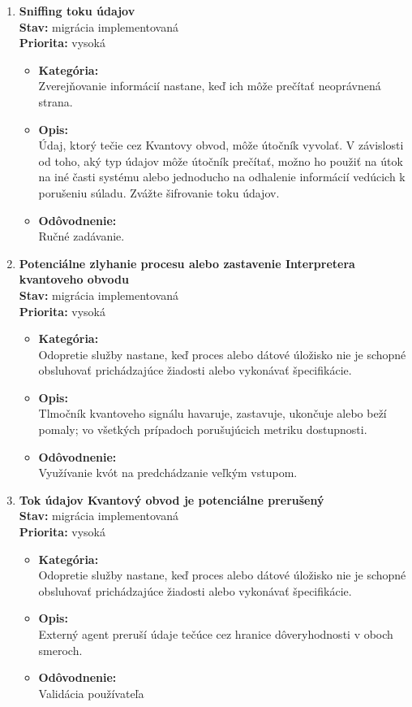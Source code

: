 \begin{enumerate}
\item \textbf{Sniffing toku údajov} \\
\textbf{Stav:} migrácia implementovaná \\
\textbf{Priorita:} vysoká

\begin{itemize}
\item[] \textbf{Kategória:} \\ 
Zverejňovanie informácií nastane, keď ich môže prečítať neoprávnená strana.
\item[] \textbf{Opis:} \\
Údaj, ktorý tečie cez Kvantovy obvod, môže útočník vyvolať. V závislosti od toho, aký typ údajov môže útočník prečítať, možno ho použiť na útok na iné časti systému alebo jednoducho na odhalenie informácií vedúcich k porušeniu súladu. Zvážte šifrovanie toku údajov.
\item[] \textbf{Odôvodnenie:} \\ 
Ručné zadávanie.
\end{itemize}

\item \textbf{Potenciálne zlyhanie procesu alebo zastavenie Interpretera kvantoveho obvodu} \\ 
\textbf{Stav:} migrácia implementovaná \\
\textbf{Priorita:} vysoká

\begin{itemize}
\item[] \textbf{Kategória:} \\
Odopretie služby nastane, keď proces alebo dátové úložisko nie je schopné obsluhovať prichádzajúce žiadosti alebo vykonávať špecifikácie.
\item[] \textbf{Opis:} \\ 
Tlmočník kvantoveho signálu havaruje, zastavuje, ukončuje alebo beží pomaly; vo všetkých prípadoch porušujúcich metriku dostupnosti.
\item[] \textbf{Odôvodnenie:} \\
Využívanie kvót na predchádzanie veľkým vstupom.
\end{itemize}

\item \textbf{Tok údajov Kvantový obvod je potenciálne prerušený} \\
\textbf{Stav:} migrácia implementovaná \\
\textbf{Priorita:} vysoká

\begin{itemize}
\item[] \textbf{Kategória:} \\
Odopretie služby nastane, keď proces alebo dátové úložisko nie je schopné obsluhovať prichádzajúce žiadosti alebo vykonávať špecifikácie.
\item[] \textbf{Opis:} \\
Externý agent preruší údaje tečúce cez hranice dôveryhodnosti v oboch smeroch.
\item[] \textbf{Odôvodnenie:} \\
Validácia používateľa
\end{itemize}


\end{enumerate}
